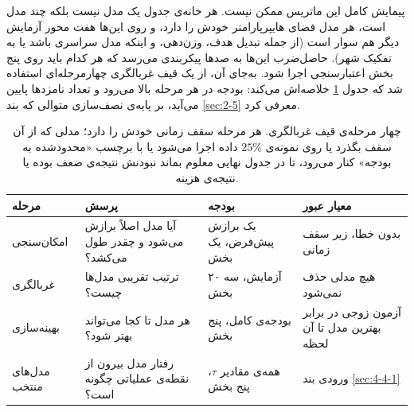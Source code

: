\setcounter{fnfamily}{\value{footnote}}
\setcounter{footnote}{\value{fnfamily}}

پیمایش کامل این ماتریس ممکن نیست. هر خانه‌ی جدول یک مدل نیست بلکه چند مدل است، هر مدل
فضای هایپرپارامتر خودش را دارد، و روی این‌ها هفت محور آزمایش دیگر هم سوار است (از جمله
تبدیل هدف، وزن‌دهی، و اینکه مدل سراسری باشد یا به تفکیک شهر). حاصل‌ضرب این‌ها به صدها
پیکربندی می‌رسد که هر کدام باید روی پنج بخش اعتبارسنجی اجرا شود. به‌جای آن، از یک قیف
غربالگری چهارمرحله‌ای استفاده شد که جدول
\ref{tab:funnel} خلاصه‌اش می‌کند: بودجه در هر مرحله بالا می‌رود و تعداد نامزدها پایین
می‌آید، بر پایه‌ی نصف‌سازی متوالی که بند \ref{sec:2-5} معرفی کرد.

\begin{table}[!ht]
\centering
\footnotesize
\singlespacing
\renewcommand{\arraystretch}{0.95}
\caption[چهار مرحله‌ی قیف غربالگری]{%
چهار مرحله‌ی قیف غربالگری. هر مرحله سقف زمانی خودش را دارد؛ مدلی که از آن سقف بگذرد یا
روی نمونه‌ی $25\%$ داده اجرا می‌شود یا با برچسب «محدودشده به بودجه» کنار می‌رود، تا در
جدول نهایی معلوم بماند نبودنش نتیجه‌ی ضعف بوده یا نتیجه‌ی هزینه.}
\label{tab:funnel}
\vspace{2mm}
\begin{tabular}{|p{1.9cm}|p{4.6cm}|p{2.5cm}|p{3.4cm}|}
\hline
\textbf{مرحله} & \textbf{پرسش} & \textbf{بودجه} & \textbf{معیار عبور} \\
\hline
امکان‌سنجی & آیا مدل اصلاً برازش می‌شود و چقدر طول می‌کشد؟ & یک برازش پیش‌فرض، یک بخش & بدون خطا، زیر سقف زمانی \\
\hline
غربالگری & ترتیب تقریبی مدل‌ها چیست؟ & ۲۰ آزمایش، سه بخش & هیچ مدلی حذف نمی‌شود \\
\hline
بهینه‌سازی & هر مدل تا کجا می‌تواند بهتر شود؟ & بودجه‌ی کامل، پنج بخش & آزمون زوجی در برابر بهترین مدل تا آن لحظه \\
\hline
مدل‌های منتخب & رفتار مدل بیرون از نقطه‌ی عملیاتی چگونه است؟ & همه‌ی مقادیر $\tau$، پنج بخش & ورودی بند \ref{sec:4-4-1} \\
\hline
\end{tabular}
\end{table}

